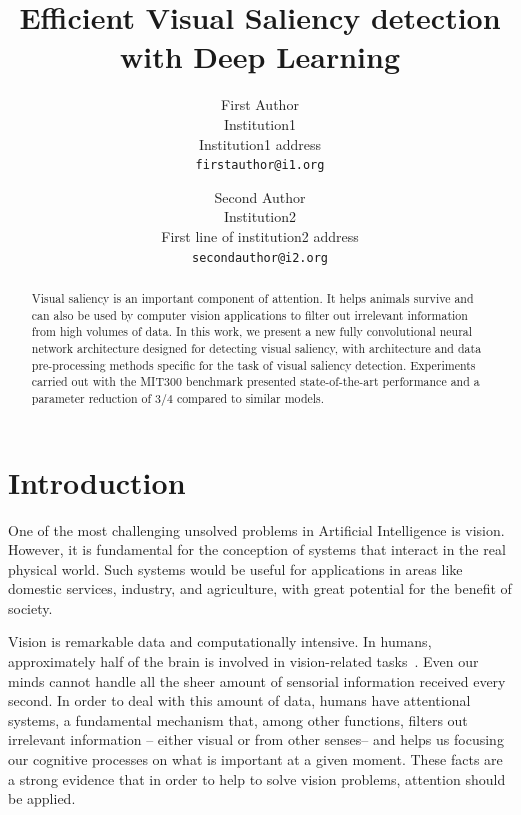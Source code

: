 \documentclass[10pt,twocolumn,letterpaper]{article}
\begin{document}
\title{Efficient Visual Saliency detection with Deep Learning}

\author{First Author\\
Institution1\\
Institution1 address\\
{\tt\small firstauthor@i1.org}
\and
Second Author\\
Institution2\\
First line of institution2 address\\
{\tt\small secondauthor@i2.org}
}

\maketitle

\begin{abstract}
Visual saliency is an important component of attention.
It helps animals survive and can also be used by computer vision applications
to filter out irrelevant information from high volumes of data.
In this work, we present a new fully convolutional neural network
architecture designed for detecting visual saliency,
with architecture and data pre-processing methods specific
for the task of visual saliency detection.
Experiments carried out with the MIT300 benchmark presented state-of-the-art
performance and a parameter reduction of 3/4 compared to similar models.
\end{abstract}

\section{Introduction}
One of the most challenging unsolved problems in Artificial Intelligence
is vision.
However, it is fundamental for the conception of systems that interact
in the real physical world.
Such systems would be useful for applications in areas like
domestic services, industry, and agriculture,
with great potential for the benefit of society.

Vision is remarkable data and computationally intensive.
In humans, approximately half of the brain is involved in
vision-related tasks~\cite{fixott_1957}.
Even our minds cannot handle all the sheer amount of sensorial information
received every second. In order to deal with this amount of data,
humans have attentional systems, a fundamental mechanism
that, among other functions, filters out irrelevant information
-- either visual or from other senses-- and helps us focusing our cognitive
processes on what is important at a given moment.
These facts are a strong evidence that in order to help to solve
vision problems, attention should be applied.
\end{document}
